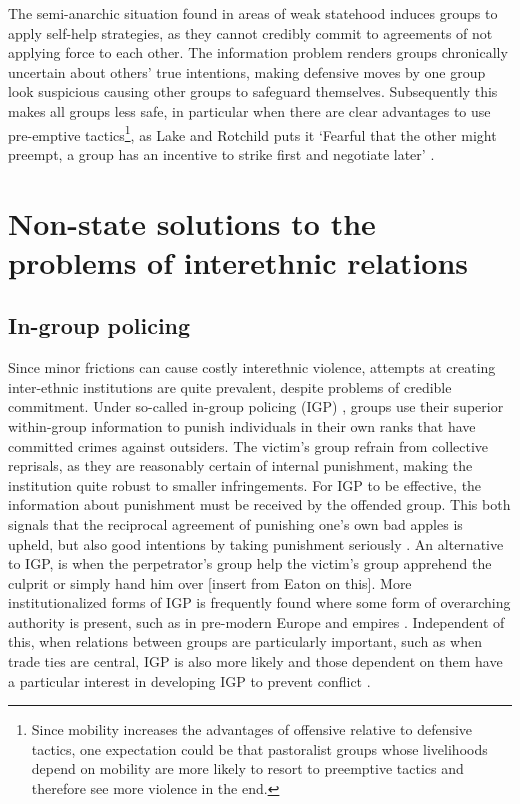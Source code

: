 \documentclass[12pt]{article}
\begin{document}
The semi-anarchic situation found in areas of weak statehood induces groups to
apply self-help strategies, as they cannot credibly commit to agreements of not
applying force to each other. The information problem renders groups chronically
uncertain about others’ true intentions, making defensive moves by one group
look suspicious causing other groups to safeguard themselves. Subsequently this
makes all groups less safe, in particular when there are clear advantages to use
pre-emptive tactics\footnote{Since mobility increases the advantages of
	offensive relative to defensive tactics, one expectation could be that
	pastoralist groups whose livelihoods depend on mobility are more likely
	to resort to preemptive tactics and therefore see more violence in the
	end.}, as Lake and Rotchild puts it ‘Fearful that the other might
preempt, a group has an incentive to strike first and negotiate later’
\citep[53]{Lake_1996}.

\section{Non-state solutions to the problems of interethnic relations}

\subsection{In-group policing}

Since minor frictions can cause costly interethnic violence, attempts at
creating inter-ethnic institutions are quite prevalent, despite problems of
credible commitment. Under so-called in-group policing (IGP)
\citep[723]{Fearon_1996}, groups use their superior within-group information to
punish individuals in their own ranks that have committed crimes against
outsiders. The victim’s group refrain from collective reprisals, as they are
reasonably certain of internal punishment, making the institution quite robust
to smaller infringements. For IGP to be effective, the information about
punishment must be received by the offended group. This both signals that the
reciprocal agreement of punishing one’s own bad apples is upheld, but also good
intentions by taking punishment seriously \citep{Fearon_1996}. An
alternative to IGP, is when the perpetrator’s group help the victim’s group
apprehend the culprit or simply hand him over [insert from Eaton on this]. More
institutionalized forms of IGP is frequently found where some form of
overarching authority is present, such as in pre-modern Europe and empires
\citep[728]{Fearon_1996}. Independent of this, when relations between
groups are particularly important, such as when trade ties are central, IGP is
also more likely and those dependent on them have a particular interest in
developing IGP to prevent conflict \citep[730]{Fearon_1996}.
\end{document}

